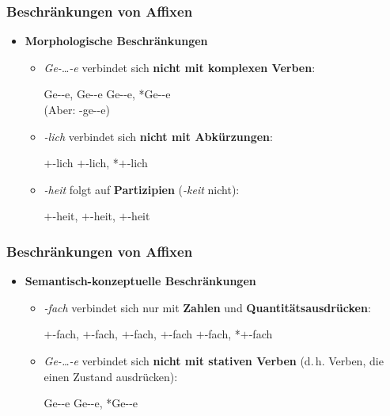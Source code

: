 \begin{frame}
\frametitle{Beschränkungen von Affixen}


\begin{itemize}
\item \textbf{Morphologische Beschränkungen}

\begin{itemize}
\item \emph{Ge-}{\dots}\emph{-e} verbindet sich \textbf{nicht mit komplexen Verben}:

\ea Ge--e, Ge--e \vs *Ge--e, *Ge--e\\
(Aber: -ge--e)
\z

\pause

\item \emph{-lich} verbindet sich \textbf{nicht mit Abkürzungen}:

\ea {}$+$-lich \vs *$+$-lich, *$+$-lich
\z

\pause 

\item \emph{-heit} folgt auf \textbf{Partizipien} (\emph{-keit} nicht):

\ea {}$+$-heit, $+$-heit, $+$-heit
\z

\end{itemize}

\end{itemize}

\end{frame}


\begin{frame}
\frametitle{Beschränkungen von Affixen}

\begin{itemize}
\item \textbf{Semantisch-konzeptuelle Beschränkungen}

\begin{itemize}
\item \emph{-fach} verbindet sich nur mit \textbf{Zahlen} und \textbf{Quantitätsausdrücken}:

\ea {}$+$-fach, $+$-fach, $+$-fach, $+$-fach \vs *$+$-fach, *$+$-fach
\z

\pause

\item \textit{Ge-{\dots}-e} verbindet sich \textbf{nicht mit stativen Verben} (d.\,h. Verben, die einen Zustand ausdrücken):

\ea Ge--e \vs *Ge--e, *Ge--e
\z

\end{itemize}

\end{itemize}

\end{frame}


